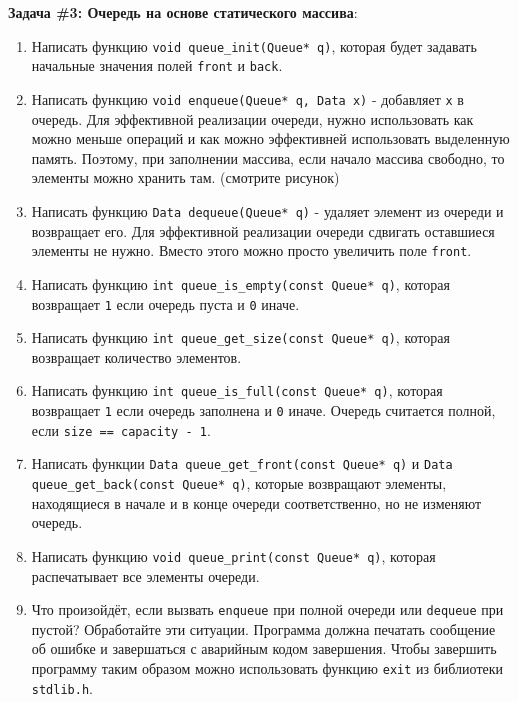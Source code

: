\documentclass[10pt]{article}
\begin{document}
\textbf{Задача \#3: Очередь на основе статического массива}:
\begin{enumerate}
\item Написать функцию \texttt{void queue\_init(Queue* q)}, которая будет задавать начальные значения полей \texttt{front} и \texttt{back}.
\item Написать функцию \texttt{void enqueue(Queue* q, Data x)} - добавляет \texttt{x} в очередь. Для эффективной реализации очереди, нужно использовать как можно меньше операций и как можно эффективней использовать выделенную память. Поэтому, при заполнении массива, если начало массива свободно, то элементы можно хранить там. (смотрите рисунок)
\item Написать функцию \texttt{Data dequeue(Queue* q)} - удаляет элемент из очереди и возвращает его. Для  эффективной реализации очереди сдвигать оставшиеся элементы не нужно. Вместо этого можно просто увеличить поле \texttt{front}.
\item Написать функцию \texttt{int queue\_is\_empty(const Queue* q)}, которая возвращает \texttt{1} если очередь пуста и \texttt{0} иначе.
\item Написать функцию \texttt{int queue\_get\_size(const Queue* q)}, которая возвращает количество элементов.
\item Написать функцию \texttt{int queue\_is\_full(const Queue* q)}, которая возвращает \texttt{1} если очередь заполнена и \texttt{0} иначе. Очередь считается полной, если \texttt{size == capacity - 1}.
\item Написать функции \texttt{Data queue\_get\_front(const Queue* q)} и \texttt{Data queue\_get\_back(const Queue* q)}, которые возвращают элементы, находящиеся в начале и в конце очереди соответственно, но не изменяют очередь.
\item Написать функцию \texttt{void queue\_print(const Queue* q)}, которая распечатывает все элементы очереди.
\item Что произойдёт, если вызвать \texttt{enqueue} при полной очереди или \texttt{dequeue} при пустой? Обработайте эти ситуации. Программа должна печатать сообщение об ошибке и завершаться с аварийным кодом завершения. Чтобы завершить программу таким образом можно использовать функцию \texttt{exit} из библиотеки \texttt{stdlib.h}.


\end{enumerate}
\end{document}
